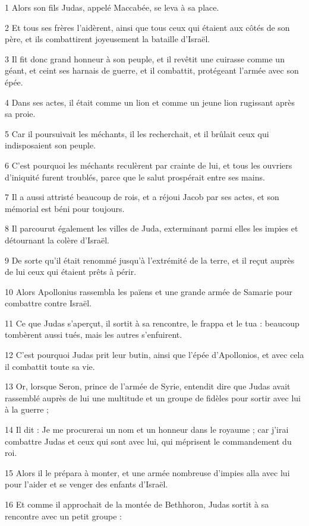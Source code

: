 \par 1 Alors son fils Judas, appelé Maccabée, se leva à sa place.
\par 2 Et tous ses frères l'aidèrent, ainsi que tous ceux qui étaient aux côtés de son père, et ils combattirent joyeusement la bataille d'Israël.
\par 3 Il fit donc grand honneur à son peuple, et il revêtit une cuirasse comme un géant, et ceint ses harnais de guerre, et il combattit, protégeant l'armée avec son épée.
\par 4 Dans ses actes, il était comme un lion et comme un jeune lion rugissant après sa proie.
\par 5 Car il poursuivait les méchants, il les recherchait, et il brûlait ceux qui indisposaient son peuple.
\par 6 C'est pourquoi les méchants reculèrent par crainte de lui, et tous les ouvriers d'iniquité furent troublés, parce que le salut prospérait entre ses mains.
\par 7 Il a aussi attristé beaucoup de rois, et a réjoui Jacob par ses actes, et son mémorial est béni pour toujours.
\par 8 Il parcourut également les villes de Juda, exterminant parmi elles les impies et détournant la colère d'Israël.
\par 9 De sorte qu'il était renommé jusqu'à l'extrémité de la terre, et il reçut auprès de lui ceux qui étaient prêts à périr.
\par 10 Alors Apollonius rassembla les païens et une grande armée de Samarie pour combattre contre Israël.
\par 11 Ce que Judas s'aperçut, il sortit à sa rencontre, le frappa et le tua : beaucoup tombèrent aussi tués, mais les autres s'enfuirent.
\par 12 C'est pourquoi Judas prit leur butin, ainsi que l'épée d'Apollonios, et avec cela il combattit toute sa vie.
\par 13 Or, lorsque Seron, prince de l'armée de Syrie, entendit dire que Judas avait rassemblé auprès de lui une multitude et un groupe de fidèles pour sortir avec lui à la guerre ;
\par 14 Il dit : Je me procurerai un nom et un honneur dans le royaume ; car j'irai combattre Judas et ceux qui sont avec lui, qui méprisent le commandement du roi.
\par 15 Alors il le prépara à monter, et une armée nombreuse d'impies alla avec lui pour l'aider et se venger des enfants d'Israël.
\par 16 Et comme il approchait de la montée de Bethhoron, Judas sortit à sa rencontre avec un petit groupe :
